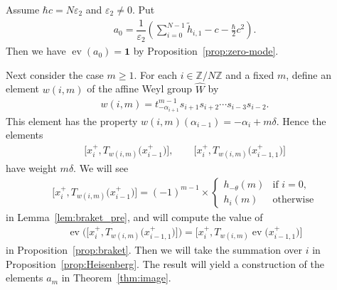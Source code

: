 \documentclass[11pt]{article}
\theoremstyle{definition}
\numberwithin{equation}{section}
\DeclareMathOperator{\ev}{ev}
\newcommand{\ve}{\varepsilon}
\newcommand{\bbZ}{\mathbb{Z}}
\newcommand{\bfid}{\mathbf{1}}
\begin{document}
Assume $\hbar c = N \ve_2$ and $\ve_2 \neq 0$. Put
\begin{gather*}
a_0 = \dfrac{1}{\ve_2} \left( \sum_{i=0}^{N-1} \tilde{h}_{i,1} - c - \tfrac{\hbar}{2} c^2\right).
\end{gather*}
Then we have $\ev(a_0) = \bfid$ by Proposition~\ref{prop:zero-mode}.

Next consider the case $m \geq 1$. For each $i \in \bbZ/N\bbZ$ and a fixed $m$, define an element $w(i,m)$ of the affine Weyl group $\hat{W}$ by
\begin{gather*}
w(i,m) = t_{-\alpha_{i+1}}^{m-1} s_{i+1} s_{i+2} \cdots s_{i-3} s_{i-2}.
\end{gather*}
This element has the property $w(i,m)(\alpha_{i-1}) = -\alpha_{i} + m \delta$. Hence the elements
\begin{gather*}
\big[x_{i}^{+}, T_{w(i,m)}\big(x_{i-1}^{+}\big)\big],\qquad \big[x_{i}^{+}, T_{w(i,m)}\big(x_{i-1,1}^{+}\big)\big]
\end{gather*} have weight $m\delta$.
We will see
\begin{gather*}
\big[x_{i}^+, T_{w(i,m)}\big(x_{i-1}^+\big)\big] = (-1)^{m-1} \times \begin{cases}
h_{-\theta}(m) & \text{if $i=0$},\\
h_i(m) & \text{otherwise}
\end{cases}
\end{gather*}
in Lemma~\ref{lem:braket_pre}, and will compute the value of
\begin{gather*}
\ev \big( \big[x_{i}^{+}, T_{w(i,m)}\big(x_{i-1,1}^{+}\big)\big]\big) = \big[x_{i}^{+}, T_{w(i,m)}\ev\big(x_{i-1,1}^{+}\big)\big]
\end{gather*}
in Proposition~\ref{prop:braket}. Then we will take the summation over $i$ in Proposition~\ref{prop:Heisenberg}. The result will yield a construction of the elements $a_m$ in Theorem~\ref{thm:image}.
\end{document}
